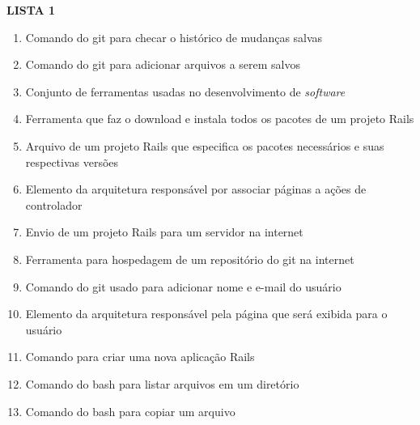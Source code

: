 \documentclass[a4paper,10pt]{article}
\begin{document}
\begin{multicols*}{2}
\begin{enumerate}
    \textbf{LISTA 1}
    \begin{enumerate}[label=(\enumalphalphcnt*),start=27,itemsep=0em]
      \item Comando do git para checar o histórico de mudanças salvas
      \item Comando do git para adicionar arquivos a serem salvos
      \item Conjunto de ferramentas usadas no desenvolvimento de \textit{software}
      \item Ferramenta que faz o download e instala todos os pacotes de um projeto Rails
      \item Arquivo de um projeto Rails que especifica os pacotes necessários e suas respectivas versões
      \item Elemento da arquitetura responsável por associar páginas a ações de controlador
      \item Envio de um projeto Rails para um servidor na internet
      \item Ferramenta para hospedagem de um repositório do git na internet
      \item Comando do git usado para adicionar nome e e-mail do usuário
      \item Elemento da arquitetura responsável pela página que será exibida para o usuário
      \item Comando para criar uma nova aplicação Rails
      \item Comando do bash para listar arquivos em um diretório
      \item Comando do bash para copiar um arquivo

\end{enumerate}
\end{enumerate}
\end{multicols*}
\end{document}
